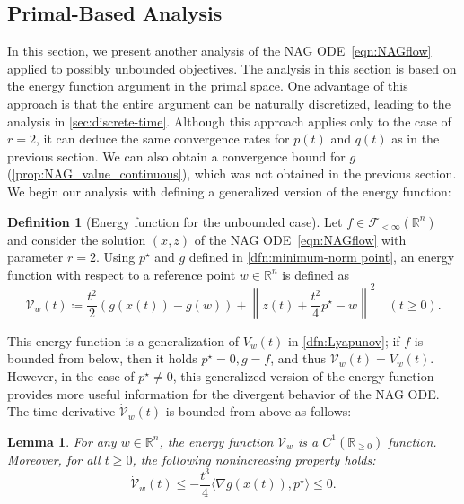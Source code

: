 \documentclass[11pt,a4paper]{article}
\theoremstyle{definition}
\newtheorem{dfn}{Definition}[section]
\theoremstyle{plain}
\newtheorem{lem}[lem]{Lemma}
\newcommand{\RR}{{\mathbb{R}}}
\begin{document}
\subsection{Primal-Based Analysis}
\label{subsec:continuous-analog}
In this section, we present another analysis of the NAG ODE~\eqref{eqn:NAGflow} applied to possibly unbounded objectives.
The analysis in this section is based on the energy function argument in the primal space.
One advantage of this approach is that the entire argument can be naturally discretized, leading to the analysis in \cref{sec:discrete-time}.
Although this approach applies only to the case of $r = 2$, it can deduce the same convergence rates for $p(t)$ and $q(t)$ as in the previous section.
We can also obtain a convergence bound for $g$ (\cref{prop:NAG_value_continuous}), which was not obtained in the previous section.
We begin our analysis with defining a generalized version of the energy function:
\begin{dfn}[Energy function for the unbounded case]
    \label{dfn:Lyapunov_continuous}
    Let $f \in \mathcal{F}_{<\infty}(\RR^n)$ and consider the solution $(x, z)$ of the NAG ODE~\eqref{eqn:NAGflow} with parameter $r = 2$.
    Using $p^\star$ and $g$ defined in \cref{dfn:minimum-norm point}, an energy function with respect to a reference point $w \in \RR^n$ is defined as
    \[
        \mathcal{V}_w(t) \coloneqq \frac{t^2}2(g(x(t)) - g(w)) + \left\|z(t) + \frac{t^2}4p^\star - w\right\|^2\quad (t \ge 0).
    \]
\end{dfn}
This energy function is a generalization of $V_w(t)$ in \cref{dfn:Lyapunov}; if $f$ is bounded from below, then it holds $p^\star = 0, g = f$, and thus $\mathcal{V}_w(t) = V_w(t)$.
However, in the case of $p^\star \neq 0$, this generalized version of the energy function provides more useful information for the divergent behavior of the NAG ODE.
The time derivative $\dot{\mathcal{V}}_w(t)$ is bounded from above as follows:
\begin{lem}\label{lem:energy_continuous}
    For any $w \in \RR^n$, the energy function $\mathcal{V}_w$ is a $C^1(\RR_{\ge 0})$ function.
    Moreover, for all $t \ge 0$, the following nonincreasing property holds:
    \[
        \dot{\mathcal{V}}_w(t) \le - \frac{t^3}4\langle\nabla g(x(t)), p^\star\rangle \le 0.
    \]
\end{lem}
\end{document}
